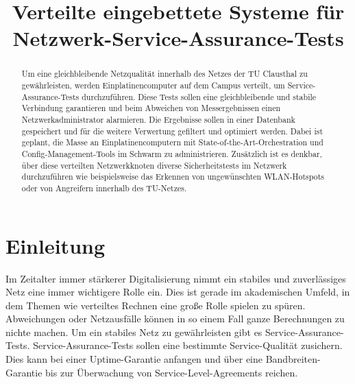 \documentclass[conference]{IEEEtran}
\begin{document}
\title{Verteilte eingebettete Systeme für Netzwerk-Service-Assurance-Tests}
\author{
}

\maketitle

\begin{abstract}
    Um eine gleichbleibende Netzqualität innerhalb des Netzes der
    TU Clausthal zu gewährleisten, werden Einplatinencomputer auf dem
    Campus verteilt, um Service-Assurance-Tests durchzuführen. Diese
    Tests sollen eine gleichbleibende und stabile Verbindung garantieren
    und beim Abweichen von Messergebnissen einen Netzwerkadministrator
    alarmieren. Die Ergebnisse sollen in einer Datenbank gespeichert und
    für die weitere Verwertung gefiltert und optimiert
    werden. Dabei ist geplant, die Masse an Einplatinencomputern mit
    State-of-the-Art-Orchestration und Config-Management-Tools im
    Schwarm zu administrieren. Zusätzlich ist es denkbar, über diese
    verteilten Netzwerkknoten diverse Sicherheitstests im Netzwerk
    durchzuführen wie beispielsweise das Erkennen von ungewünschten
    WLAN-Hotspots oder von Angreifern innerhalb des TU-Netzes.
\end{abstract}

\IEEEpeerreviewmaketitle

\section{Einleitung}
Im Zeitalter immer stärkerer Digitalisierung nimmt ein stabiles und
zuverlässiges Netz eine immer wichtigere Rolle ein. Dies ist gerade im
akademischen Umfeld, in dem Themen wie verteiltes Rechnen eine große
Rolle spielen zu spüren. Abweichungen oder Netzausfälle können in so einem Fall
ganze Berechnungen zu nichte machen. Um ein stabiles Netz zu
gewährleisten gibt es Service-Assurance-Tests. Service-Assurance-Tests
sollen eine bestimmte Service-Qualität zusichern. Dies kann
bei einer Uptime-Garantie anfangen und über eine Bandbreiten-Garantie bis zur
Überwachung von Service-Level-Agreements reichen.
\end{document}

